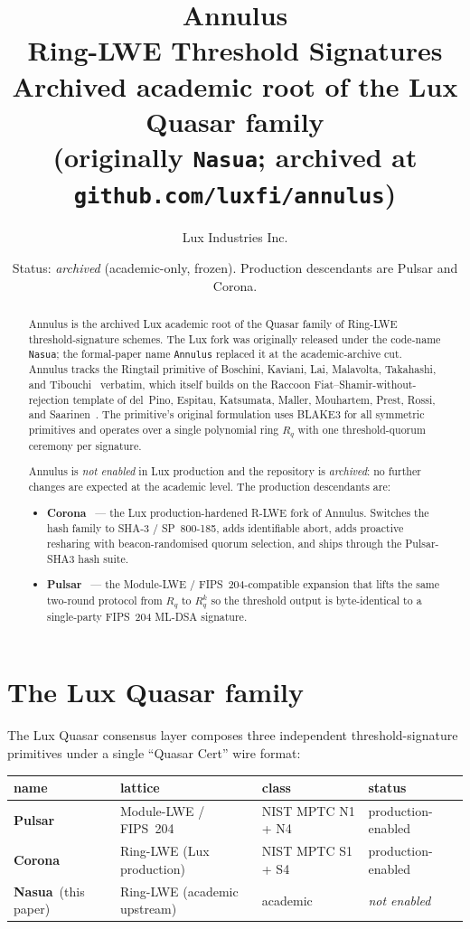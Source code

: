 \documentclass[11pt,a4paper]{article}
\title{Annulus\\
       \large Ring-LWE Threshold Signatures\\
       Archived academic root of the Lux Quasar family\\
       \normalsize (originally \texttt{Nasua}; archived at \texttt{github.com/luxfi/annulus})}
\author{Lux Industries Inc.}
\date{Status: \emph{archived} (academic-only, frozen). Production descendants are Pulsar and Corona.}
\theoremstyle{definition}
\theoremstyle{remark}
\newcommand{\Rq}{R_q}
\begin{document}
\maketitle

\begin{abstract}
Annulus is the archived Lux academic root of the Quasar family of
Ring-LWE threshold-signature schemes. The Lux fork was originally
released under the code-name \texttt{Nasua}; the formal-paper name
\texttt{Annulus} replaced it at the academic-archive cut. Annulus
tracks the Ringtail primitive of Boschini, Kaviani, Lai, Malavolta,
Takahashi, and Tibouchi~\cite{boschini2024ringtail} verbatim, which
itself builds on the Raccoon Fiat--Shamir-without-rejection
template of del~Pino, Espitau, Katsumata, Maller, Mouhartem,
Prest, Rossi, and Saarinen~\cite{raccoon2024}. The primitive's
original formulation uses BLAKE3 for all symmetric primitives and
operates over a single polynomial ring $\Rq$ with one
threshold-quorum ceremony per signature.

Annulus is \emph{not enabled} in Lux production and the repository
is \emph{archived}: no further changes are expected at the
academic level. The production descendants are:
\begin{itemize}[leftmargin=*, itemsep=0pt]
\item \textbf{Corona}~\cite{corona} --- the Lux production-hardened
R-LWE fork of Annulus. Switches the hash family to SHA-3 / SP~800-185,
adds identifiable abort, adds proactive resharing with
beacon-randomised quorum selection, and ships through the Pulsar-SHA3
hash suite.
\item \textbf{Pulsar}~\cite{pulsar} --- the Module-LWE /
FIPS~204-compatible expansion that lifts the same two-round
protocol from $\Rq$ to $\Rq^k$ so the threshold output is
byte-identical to a single-party FIPS~204 ML-DSA signature.
\end{itemize}
\end{abstract}

\section{The Lux Quasar family}
\label{sec:family}

The Lux Quasar consensus layer composes three independent
threshold-signature primitives under a single ``Quasar Cert'' wire
format:

\begin{center}\small
\begin{tabular}{l l l l}
\toprule
name & lattice & class & status \\
\midrule
\textbf{Pulsar} & Module-LWE / FIPS~204     & NIST MPTC N1 + N4 & production-enabled \\
\textbf{Corona} & Ring-LWE (Lux production) & NIST MPTC S1 + S4 & production-enabled \\
\textbf{Nasua}~(this paper) & Ring-LWE (academic upstream) & academic & \emph{not enabled} \\
\bottomrule
\end{tabular}
\end{center}
\end{document}
